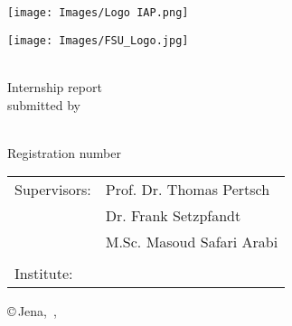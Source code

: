 \thispagestyle{empty}
\begin{titlepage}
\vspace{-8cm}
\begin{minipage}{0.5\textwidth}
	\centering
	\hspace{-2cm}
	\texttt{[image: Images/Logo IAP.png]}
	\end{minipage}
	\hfill
	\begin{minipage}{0.5\textwidth}
	\hspace{1.25cm}
	\texttt{[image: Images/FSU\_Logo.jpg]}
\end{minipage}

\vspace{0.5cm}
\begin{center}
	
	\huge
	\textbf{\titel}\\[1cm]
	\Large
	Internship report\\[1cm]
	\large
	submitted by
	
	\Large
	\autor\\[0.5cm]
	\small
	Registration number \matrikelnr\\[2cm]
	
	
	\large
	\begin{tabular}{p{3cm}p{8cm}}\\
		Supervisors: & \quad Prof. Dr. Thomas Pertsch\\
					& \quad Dr. Frank Setzpfandt\\
					& \quad M.Sc. Masoud Safari Arabi\\
					& \quad \\				
		Institute: & \quad \unternehmen
	\end{tabular}
\end{center}

\newcommand{\mydate}{\monthname\,\the\day , \the\year}
\vspace{5.1cm}
\begin{center}
\copyright\,Jena, \mydate
\end{center}


\end{titlepage}
